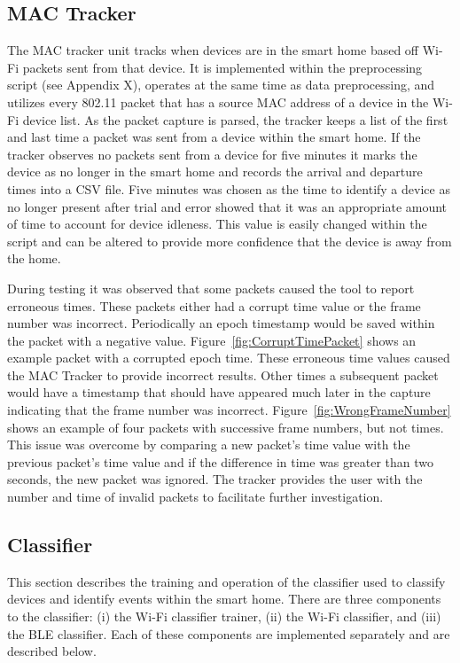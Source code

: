\documentclass[12pt,letterpaper,oneside]{book}
\begin{document}
			\subsection{MAC Tracker}
			The \ac{MAC} tracker unit tracks when devices are in the smart home based off Wi-Fi packets sent from that device. It is implemented within the preprocessing script (see Appendix X), operates at the same time as data preprocessing, and utilizes every 802.11 packet that has a source \ac{MAC} address of a device in the Wi-Fi device list. As the packet capture is parsed, the tracker keeps a list of the first and last time a packet was sent from a device within the smart home. If the tracker observes no packets sent from a device for five minutes it marks the device as no longer in the smart home and records the arrival and departure times into a \ac{CSV} file. Five minutes was chosen as the time to identify a device as no longer present after trial and error showed that it was an appropriate amount of time to account for device idleness. This value is easily changed within the script and can be altered to provide more confidence that the device is away from the home.
			
			During testing it was observed that some packets caused the tool to report erroneous times. These packets either had a corrupt time value or the frame number was incorrect. Periodically an epoch timestamp would be saved within the packet with a negative value. Figure~\ref{fig:CorruptTimePacket} shows an example packet with a corrupted epoch time. These erroneous time values caused the \ac{MAC} Tracker to provide incorrect results. Other times a subsequent packet would have a timestamp that should have appeared much later in the capture indicating that the frame number was incorrect. Figure~\ref{fig:WrongFrameNumber} shows an example of four packets with successive frame numbers, but not times. This issue was overcome by comparing a new packet's time value with the previous packet's time value and if the difference in time was greater than two seconds, the new packet was ignored. The tracker provides the user with the number and time of invalid packets to facilitate further investigation.
			
			\figCorruptTimePacket
			\figWrongFrameNumber
		
			\subsection{Classifier}
			This section describes the training and operation of the classifier used to classify devices and identify events within the smart home. There are three components to the classifier: (i) the Wi-Fi classifier trainer, (ii) the Wi-Fi classifier, and (iii) the \ac{BLE} classifier. Each of these components are implemented separately and are described below.
			
\end{document}

